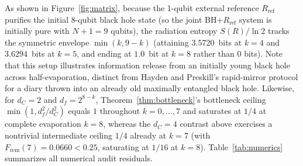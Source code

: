 \documentclass[11pt,a4paper]{article}
\theoremstyle{definition}
\theoremstyle{remark}
\newcommand{\1}{\mathbf{1}}
\begin{document}
As shown in Figure~\ref{fig:matrix}, because the 1-qubit external reference $R_{\mathrm{ref}}$ purifies the initial 8-qubit black hole state (so the joint BH+$R_{\mathrm{ref}}$ system is initially pure with $N+1=9$ qubits), the radiation entropy $S(R)/\ln 2$ tracks the symmetric envelope $\min(k, 9-k)$ (attaining $3.5720$~bits at $k=4$ and $3.6294$~bits at $k=5$, and ending at $1.0$~bit at $k=8$ rather than $0$ bits). Note that this setup illustrates information release from an initially young black hole across half-evaporation, distinct from Hayden and Preskill's \cite{HaydenPreskill2007} rapid-mirror protocol for a diary thrown into an already old maximally entangled black hole. Likewise, for $d_C = 2$ and $d_f = 2^{8-k}$, Theorem~\ref{thm:bottleneck}'s bottleneck ceiling $\min(1, d_f^2/d_C^2)$ equals $1$ throughout $k=0,\dots,7$ and saturates at $1/4$ at complete evaporation $k=8$, whereas the $d_C=4$ contrast above exercises a nontrivial intermediate ceiling $1/4$ already at $k=7$ (with $F_{\mathrm{rem}}(7)=0.0660 < 0.25$, saturating at $1/16$ at $k=8$). Table~\ref{tab:numerics} summarizes all numerical audit residuals.
\end{document}
